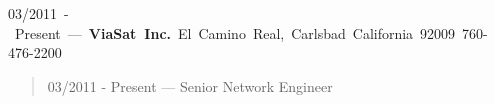 \mbox{03/2011 - Present --- {\bf ViaSat Inc.} El Camino Real, Carlsbad California 92009 760-476-2200}
\begin{quote}
03/2011 - Present --- Senior Network Engineer\\

\end{quote}
